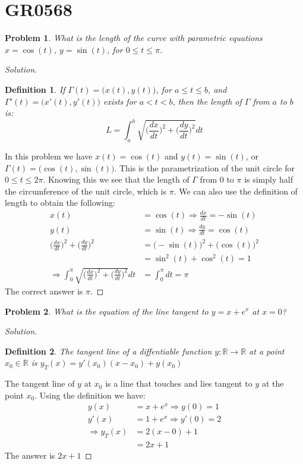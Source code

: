 \documentclass[crop=false,class=book]{standalone}
\theoremstyle{mystyle}
\newtheorem{definition}{Definition}[section]
\newtheorem{problem}{Problem}[section]
\begin{document}
\section{GR0568}
\begin{problem}
What is the length of the curve with parametric equations $x=\cos(t)$, $y=\sin(t)$, for $0\leq t \leq \pi$.
\end{problem}
\begin{proof}[Solution]
\begin{definition}
If $\Gamma(t) = \big(x(t),y(t)\big)$, for $a\leq t \leq b$, and $\Gamma'(t) = \big(x'(t),y'(t)\big)$ exists for $a<t<b$, then the length of $\Gamma$ from $a$ to $b$ is:
\begin{equation}
    L = \int_{a}^{b}\sqrt{\bigg(\frac{dx}{dt}\bigg)^2+\bigg(\frac{dy}{dt}\bigg)^2}dt
\end{equation}
\end{definition}
In this problem we have $x(t) = \cos(t)$ and $y(t) = \sin(t)$, or $\Gamma(t) = \big(\cos(t),\sin(t)\big)$. This is the parametrization of the unit circle for $0\leq t \leq 2\pi$. Knowing this we see that the length of $\Gamma$ from $0$ to $\pi$ is simply half the circumference of the unit circle, which is $\pi$. We can also use the definition of length to obtain the following:
\begin{align*}
    x(t)&=\cos(t)\Rightarrow\frac{dx}{dt}=-\sin(t)\\
    y(t)&=\sin(t)\Rightarrow\frac{dy}{dt}=\cos(t)\\
    \bigg(\frac{dx}{dt}\bigg)^{2}+\bigg(\frac{dy}{dt}\bigg)^{2}&=\big(-\sin(t)\big)^{2}+\big(\cos(t)\big)^{2}\\
    &=\sin^{2}(t)+\cos^{2}(t)=1\\
    \Rightarrow\int_{0}^{\pi}\sqrt{\bigg(\frac{dx}{dt}\bigg)^{2}+\bigg(\frac{dy}{dt}\bigg)^{2}}dt&=\int_{0}^{\pi}dt=\pi
\end{align*}
The correct answer is $\pi$.
\end{proof}
\begin{problem}
What is the equation of the line tangent to $y=x+e^x$ at $x=0$?
\end{problem}
\begin{proof}[Solution]
\begin{definition}
The tangent line of a diffentiable function $y:\mathbb{R}\rightarrow \mathbb{R}$ at a point $x_0\in \mathbb{R}$ is $y_T(x) = y'(x_0)(x-x_0) + y(x_0)$ 
\end{definition}
The tangent line of $y$ at $x_0$ is a line that touches and lies tangent to $y$ at the point $x_0$. Using the definition we have:
\begin{align*}
    y(x)&=x+e^{x}\Rightarrow y(0)=1\\
    y'(x)&=1+e^{x}\Rightarrow y'(0)=2\\
    \Rightarrow y_T(x)&=2(x-0)+1\\
    &=2x+1
\end{align*}
The answer is $2x+1$
\end{proof}
\end{document}
